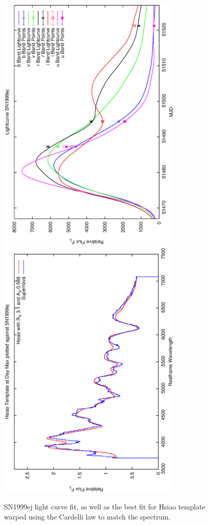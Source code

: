 \clearpage

\begin{figure}[p]
\centering
\includegraphics[angle=-90,width=0.8\textwidth]{./figures/ltcv/SN1999ej_v027_lightcurve.ps}
\hfill
\includegraphics[angle=-90,width=0.8\textwidth]{./figures/hsiao/SN1999ej_v001_hsiao.ps}
\hfill
\caption{SN1999ej light curve fit, as well as the best fit for Hsiao template warped using the Cardelli law to match the spectrum.}
\label{fig:SN1999ejfour2}
\end{figure}

